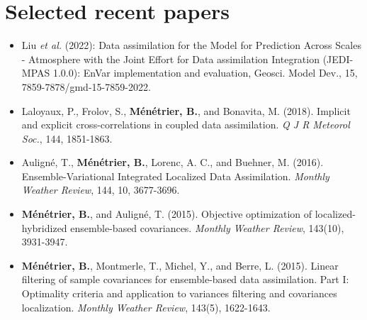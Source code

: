 \documentclass[a4paper,9pt]{scrreprt}
\begin{document}
\section*{Selected recent papers}

\begin{itemize}
\item Liu \textit{et al.} (2022): Data assimilation for the Model for Prediction Across Scales - Atmosphere with the Joint Effort for Data assimilation Integration (JEDI-MPAS 1.0.0): EnVar implementation and evaluation, Geosci. Model Dev., 15, 7859-7878/gmd-15-7859-2022.
\item Laloyaux, P., Frolov, S., \textbf{Ménétrier, B.}, and Bonavita, M. (2018). Implicit and explicit cross-correlations in coupled data assimilation. \textit{Q J R Meteorol Soc.}, 144, 1851-1863.\vspace{-0.1cm}
\item Auligné, T., \textbf{Ménétrier, B.}, Lorenc, A. C., and Buehner, M. (2016). Ensemble-Variational Integrated Localized Data Assimilation. \textit{Monthly Weather Review}, 144, 10, 3677-3696.\vspace{-0.1cm}
\item \textbf{Ménétrier, B.}, and Auligné, T. (2015). Objective optimization of localized-hybridized ensemble-based covariances. \textit{Monthly Weather Review}, 143(10), 3931-3947.\vspace{-0.1cm}
\item \textbf{Ménétrier, B.}, Montmerle, T., Michel, Y., and Berre, L. (2015). Linear filtering of sample covariances for ensemble-based data assimilation. Part I: Optimality criteria and application to variances filtering and covariances localization. \textit{Monthly Weather Review},  143(5), 1622-1643.\vspace{-0.1cm}
\end{itemize}
\end{document}
